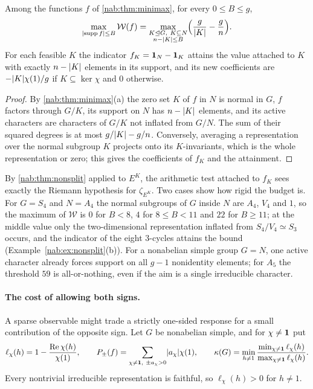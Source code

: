\begin{theorem}\label{nab:thm:budget}
Among the functions $f$ of \cref{nab:thm:minimax}, for every $0\le B\le g$,
\[
 \max_{\lvert\operatorname{supp} f\rvert\le B}\mathcal W(f)
 =\max_{\substack{K\trianglelefteq G,\ K\subseteq N\\ n-\lvert K\rvert\le B}}
   \Bigl(\frac g{\lvert K\rvert}-\frac gn\Bigr).
\]
For each feasible $K$ the indicator $f_K=\mathbf{1}_N-\mathbf{1}_K$ attains the value attached to
$K$ with exactly $n-\lvert K\rvert$ elements in its support, and its new coefficients are
$-\lvert K\rvert\chi(1)/g$ if $K\subseteq\ker\chi$ and $0$ otherwise.
\end{theorem}
\begin{proof}
By \cref{nab:thm:minimax}(a) the zero set $K$ of $f$ in $N$ is normal in $G$, $f$ factors
through $G/K$, its support on $N$ has $n-\lvert K\rvert$ elements, and its active characters are
characters of $G/K$ not inflated from $G/N$. The sum of their squared degrees is at most
$g/\lvert K\rvert-g/n$. Conversely, averaging a representation over the normal subgroup $K$
projects onto its $K$-invariants, which is the whole representation or zero; this gives the
coefficients of $f_K$ and the attainment.
\end{proof}

By \cref{nab:thm:nonsplit} applied to $E^K$, the arithmetic test attached to $f_K$ sees
exactly the Riemann hypothesis for $\zeta_{E^K}$. Two cases show how rigid the budget is.
For $G=S_4$ and $N=A_4$ the normal subgroups of $G$ inside $N$ are $A_4$, $V_4$ and $1$, so
the maximum of $\mathcal W$ is $0$ for $B<8$, $4$ for $8\le B<11$ and $22$ for $B\ge11$; at
the middle value only the two-dimensional representation inflated from $S_4/V_4\simeq S_3$
occurs, and the indicator of the eight $3$-cycles attains the bound
(Example~\ref{nab:ex:nonsplit}(b)). For a nonabelian simple group $G=N$, one active character
already forces support on all $g-1$ nonidentity elements; for $A_5$ the threshold $59$ is
all-or-nothing, even if the aim is a single irreducible character.

\paragraph{The cost of allowing both signs.}
A sparse observable might trade a strictly one-sided response for a small contribution of
the opposite sign. Let $G$ be nonabelian simple, and for $\chi\ne\mathbf{1}$ put
\[
 \ell_\chi(h)=1-\frac{\operatorname{Re}\chi(h)}{\chi(1)},\qquad
 P_\pm(f)=\sum_{\chi\ne\mathbf{1},\ \pm a_\chi>0}\lvert a_\chi\rvert\chi(1),\qquad
 \kappa(G)=\min_{h\ne1}\frac{\min_{\chi\ne\mathbf{1}}\ell_\chi(h)}{\max_{\chi\ne\mathbf{1}}\ell_\chi(h)} .
\]
Every nontrivial irreducible representation is faithful, so $\ell_\chi(h)>0$ for $h\ne1$.

